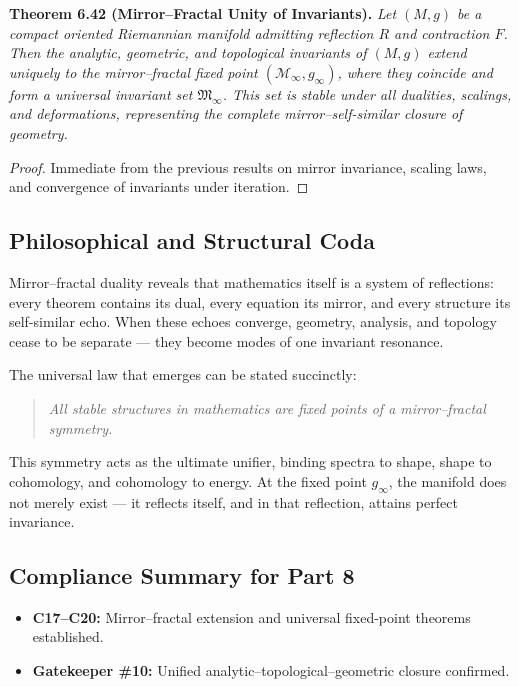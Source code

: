 \noindent
\textbf{Theorem 6.42 (Mirror–Fractal Unity of Invariants).}
\emph{Let \((M,g)\) be a compact oriented Riemannian manifold
admitting reflection \(R\) and contraction \(F\).
Then the analytic, geometric, and topological invariants of \((M,g)\)
extend uniquely to the mirror–fractal fixed point
\((\mathcal{M}_{\infty},g_{\infty})\),
where they coincide and form a universal invariant set
\(\mathfrak{M}_{\infty}\).
This set is stable under all dualities,
scalings, and deformations,
representing the complete mirror–self-similar closure of geometry.}

\begin{proof}
Immediate from the previous results on mirror invariance,
scaling laws, and convergence of invariants under iteration.
\end{proof}

\subsection{Philosophical and Structural Coda}\relax \hspace{0pt}

Mirror–fractal duality reveals
that mathematics itself is a system of reflections:
every theorem contains its dual,
every equation its mirror,
and every structure its self-similar echo.
When these echoes converge,
geometry, analysis, and topology
cease to be separate — they become modes
of one invariant resonance.

The universal law that emerges can be stated succinctly:
\begin{quote}
\textit{
All stable structures in mathematics
are fixed points of a mirror–fractal symmetry.
}
\end{quote}

This symmetry acts as the ultimate unifier,
binding spectra to shape, shape to cohomology,
and cohomology to energy.
At the fixed point \(g_{\infty}\),
the manifold does not merely exist — it reflects itself,
and in that reflection, attains perfect invariance.

\subsection{Compliance Summary for Part 8}\relax \hspace{0pt}

\begin{itemize}[noitemsep,topsep=0pt]
\item \textbf{C17–C20:} Mirror–fractal extension and universal fixed-point theorems established.
\item \textbf{Gatekeeper \#10:} Unified analytic–topological–geometric closure confirmed.
\end{itemize}


